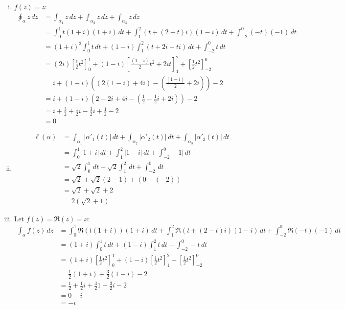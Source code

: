 \documentclass[a4paper, titlepage, DIV=14]{scrartcl}
\begin{document}
    \begin{enumerate}[i)]
        \item $f(z) = z$:
        \begin{align*}
            \oint_{\alpha} z \, dz &= \int_{\alpha_{1}} z \, dz + \int_{\alpha_{2}} z \, dz + \int_{\alpha_{3}} z \, dz \\
                &= \int_{0}^{1} t(1+i)(1+i) \, dt + \int_{1}^{2} (t+(2-t)i)(1-i) \, dt 
                    + \int_{-2}^{0} (-t)(-1) \, dt  \\
                &= (1+i)^{2}\int_{0}^{1} t \, dt + (1-i)\int_{1}^{2} (t+2i-ti) \, dt 
                    + \int_{-2}^{0} t \, dt  \\   
                &= (2i) [\frac{1}{2}t^{2}]^{1}_{0} + (1-i)[\frac{(1-i)}{2}t^{2}+2it]^{2}_{1} + [\frac{1}{2}t^{2}]^{0}_{-2}  \\  
                &= i + (1-i) ((2(1-i) + 4i)-(\frac{(1-i)}{2} +2i)) - 2 \\
                &= i + (1-i)(2-2i+4i-(\frac{1}{2}-\frac{1}{2}i+2i)) - 2 \\
                &= i + \frac{3}{2} + \frac{1}{2}i -\frac{3}{2}i + \frac{1}{2} -2 \\
                &= 0    
        \end{align*}
        \item 
        \begin{align*}
            \ell(\alpha) &= \int_{\alpha_{1}}|\alpha'_{1}(t)| \, dt + \int_{\alpha_{2}}|\alpha'_{2}(t)| \, dt
                + \int_{\alpha_{3}}|\alpha'_{3}(t)| \, dt \\
                &= \int_{0}^{1}|1+i| \, dt + \int_{1}^{2}|1-i| \, dt + \int_{-2}^{0} |-1| \, dt \\
                &= \sqrt{2}\int_{0}^{1}\, dt + \sqrt{2}\int_{1}^{2} \, dt + \int_{-2}^{0} \, dt \\
                &= \sqrt{2} + \sqrt{2}(2-1) + (0-(-2)) \\
                &= \sqrt{2} + \sqrt{2} + 2 \\
                &= 2(\sqrt{2} + 1)
        \end{align*}
        
        \item Let $f(z) = \Re(z) = x$:
        \begin{align*}
            \int_{\alpha} f(z) \, dz &= \int_{0}^{1}\Re(t(1+i))(1+i) \, dt + \int_{1}^{2}\Re(t+(2-t)i)(1-i) \, dt
                + \int_{-2}^{0}\Re(-t)(-1) \, dt \\
                &= (1+i)\int_{0}^{1}t \, dt + (1-i)\int_{1}^{2} t \, dt -\int_{-2}^{0} -t \, dt \\
                &= (1+i) [\frac{1}{2}t^{2}]^{1}_{0} + (1-i)[\frac{1}{2}t^{2}]^{2}_{1} + [\frac{1}{2}t^{2}]^{0}_{-2} \\
                &= \frac{1}{2}(1+i) + \frac{3}{2}(1-i) - 2 \\
                &= \frac{1}{2} + \frac{1}{2}i + \frac{3}{2}1 - \frac{3}{2}i - 2 \\
                &= 0 - i \\
                &= -i
        \end{align*}
    \end{enumerate}
\end{document}
